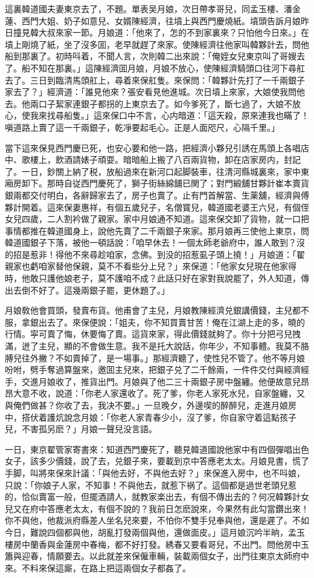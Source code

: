 這裏韓道國夫妻東京去了，不題。單表吴月娘，次日帶孝哥兒，同孟玉樓、潘金蓮、西門大姐、奶子如意兒、女婿陳經濟，往墳上與西門慶燒紙。墳頭告訴月娘昨日撞見韓大叔來家一節。月娘道：「他來了，怎的不到家裏來？只怕他今日來。」在墳上剛燒了紙，坐了沒多囬，老早就趕了來家。使陳經濟往他家叫韓夥計去，問他船到那裏了。初時呌着，不聞人言，次則韓二出來說：「俺姪女兒東京叫了哥嫂去了。船不知在那裏。」這陳經濟囬月娘，月娘不放心，使陳經濟騎頭口往河下尋舡去了。三日到臨清馬頭舡上，尋着來保舡隻。來保問：「韓夥計先打了一千兩銀子家去了？」經濟道：「誰見他來？張安看見他進城。次日墳上來家，大娘使我問他去。他兩口子絜家連銀子都拐的上東京去了。如今爹死了，斷七過了，大娘不放心，使我來找尋船隻。」這來保口中不言，心内暗道：「這天殺，原來連我也瞞了！嗔道路上賣了這一千兩銀子，乾凈要起毛心。正是人面咫尺，心隔千里。」

當下這來保見西門慶已死，也安心要和他一路，把經濟小夥兒引誘在馬頭上各唱店中、歌樓上，飲酒請婊子頑耍。暗暗船上搬了八百兩貨物，卸在店家房内，封記了。一日，鈔關上納了税，放船過來在新河口起脚裝車，往清河縣城裏來，家中東廂房卸下。那時自従西門慶死了，獅子街絲綿舖已関了；對門緞舖甘夥計崔本賣貨銀兩都交付明白，各辭歸家去了，房子也賣了。止有門首解當、生薬舖，經濟與傅夥計開着。這來保妻惠祥，有個五歲兒子，名僧寳兒，韓道國老婆王六兒，有個侄女兒四歲，二人割衿做了親家。家中月娘通不知道。這來保交卸了貨物，就一口把事情都推在韓道國身上，說他先賣了二千兩銀子來家。那月娘再三使他上東京，問韓道國銀子下落，被他一頓話說：「咱早休去！一個太師老爺府中，誰人敢到？沒的招是惹非！得他不來尋趁咱家，念佛。到没的招惹虱子頭上撓！」月娘道：「翟親家也虧咱家替他保親，莫不不看些分上兒？」來保道：「他家女兒現在他家得時，他敢只護他娘老子，莫不護咱不成？此話只好在家對我說罷了，外人知道，傳出去倒不好了。這幾兩銀子罷，更休題了。」

月娘敎他會買頭，發賣布貨。他甫會了主兒，月娘教陳經濟兑銀講價錢，主兒都不服，拿銀出去了。來保便說：「姐夫，你不知買賣甘苦！俺在江湖上走的多，曉的行情。寜可賣了悔，休要悔了賣。這貨來家，得此價錢就夠了。你十分把弓兒拽滿，迸了主兒，顯的不會做生意。我不是托大說話，你年少，不知事體。我莫不胳膊兒往外撇？不如賣掉了，是一場事。」那經濟聽了，使性兒不管了。他不等月娘吩咐，劈手奪過算盤來，邀囬主兒來，把銀子兑了二千餘兩，一件件交付與經濟經手，交進月娘收了，推貨出門。月娘與了他二三十兩銀子房中盤纏。他便故意兒昂昂大意不收，說道：「你老人家還收了。死了爹，你老人家死水兒，自家盤纏，又與俺們做甚？你收了去，我决不要。」一旦晚夕，外邊喫的醉醉兒，走進月娘房中，搭伏着護炕說念月娘：「你老人家青春少小，沒了爹，你自家守着這點孩子兒，不害孤另麽？」月娘一聲兒没言語。

一日，東京翟管家寄書來：知道西門慶死了，聽見韓道國說他家中有四個彈唱出色女子，該多少價錢，說了去，兑銀子來，要載到京中答應老太太。月娘見書，慌了手脚，叫將來保來計議：「與他去好，不與他去好？」來保進入房中，也不呌娘，只說：「你娘子人家，不知事！不與他去，就惹下祸了。這個都是過世老頭兒惹的，恰似賣富一般，但擺酒請人，就教家楽出去，有個不傳出去的？何况韓夥計女兒又在府中答應老太太，有個不說的？我前日怎麽說來，今果然有此勾當鑽出來！你不與他，他裁派府縣差人坐名兒來要，不怕你不雙手兒奉與他，還是遲了。不如今日，難說四個都與他，胡亂打發兩個與他，還做面皮。」這月娘沉吟半晌，孟玉樓房中蘭香與金蓮房中春梅，都不好打發。綉春又要看哥兒，不出門。問他房中玉簫與迎春，情願要去。以此就差來保僱車輛，裝載兩個女子，出門往東京太師府中來。不料來保這廝，在路上把這兩個女子都姦了。

